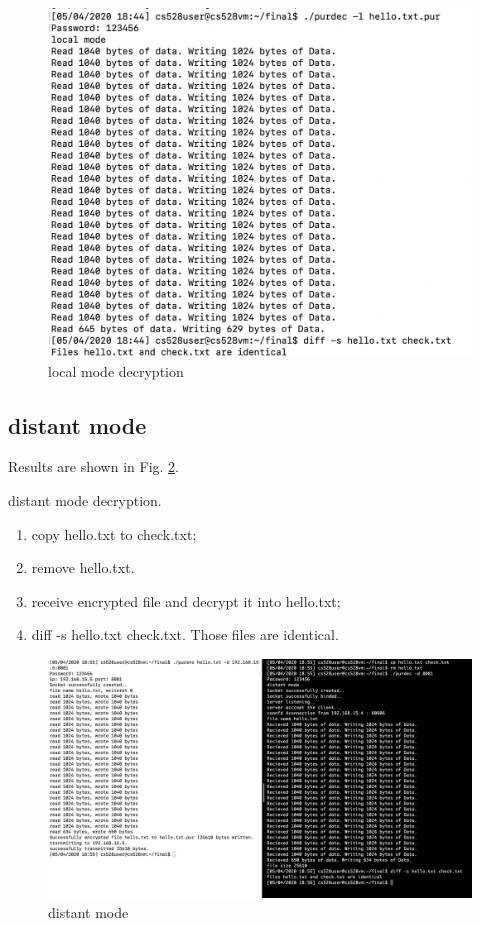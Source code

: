 \documentclass[11pt, oneside]{article}   	%
\begin{document}
\begin{figure}[htbp]
   \centering
   \includegraphics[scale = 0.7]{local2.png} %
   \caption{local mode decryption}
   \label{fig2}
\end{figure}

\subsection{distant mode}

Results are shown in Fig. \ref{fig3}. 

distant mode decryption.
\begin{enumerate}
\item copy hello.txt to check.txt;
\item remove hello.txt.
\item receive encrypted file and decrypt it into hello.txt;
\item diff -s hello.txt check.txt. Those files are identical.
\end{enumerate}

\begin{figure}[htbp]
   \centering
   \includegraphics[scale = 0.3]{distant.png} %
   \caption{distant mode}
   \label{fig3}
\end{figure}
\end{document}
